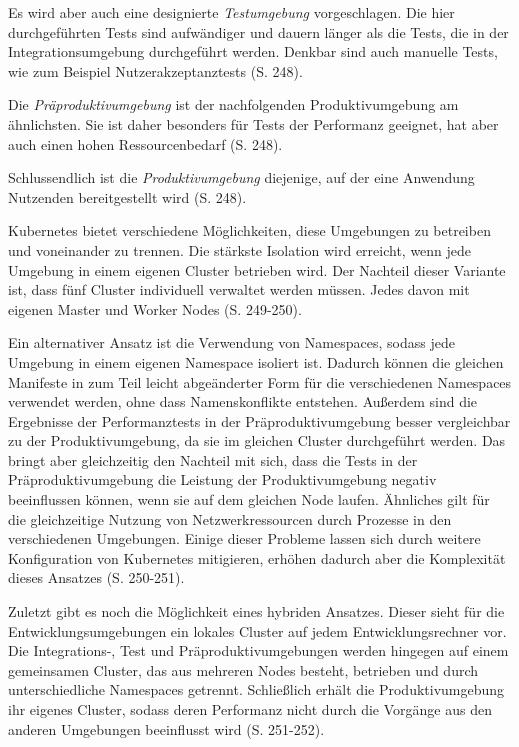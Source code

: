 \documentclass[11pt,a4paper]{article}
\begin{document}
Es wird aber auch eine designierte \emph{Testumgebung} vorgeschlagen.
Die hier durchgeführten Tests sind aufwändiger und dauern länger als
die Tests, die in der Integrationsumgebung durchgeführt werden.
Denkbar sind auch manuelle Tests, wie zum Beispiel Nutzerakzeptanztests \cite{Schmeling_Dargatz_2022} (S. 248).

Die \emph{Präproduktivumgebung} ist der nachfolgenden Produktivumgebung am ähnlichsten.
Sie ist daher besonders für Tests der Performanz geeignet, hat
aber auch einen hohen Ressourcenbedarf \cite{Schmeling_Dargatz_2022} (S. 248).

Schlussendlich ist die \emph{Produktivumgebung} diejenige, auf der eine Anwendung
Nutzenden bereitgestellt wird \cite{Schmeling_Dargatz_2022} (S. 248).

Kubernetes bietet verschiedene Möglichkeiten, diese Umgebungen zu betreiben und voneinander zu trennen.
Die stärkste Isolation wird erreicht, wenn jede Umgebung in einem eigenen Cluster betrieben wird.
Der Nachteil dieser Variante ist, dass fünf Cluster individuell verwaltet werden müssen.
Jedes davon mit eigenen Master und Worker Nodes \cite{Schmeling_Dargatz_2022} (S. 249-250).

Ein alternativer Ansatz ist die Verwendung von Namespaces, sodass jede Umgebung in einem eigenen
Namespace isoliert ist.
Dadurch können die gleichen Manifeste in zum Teil leicht abgeänderter Form für die verschiedenen
Namespaces verwendet werden, ohne dass Namenskonflikte entstehen. Außerdem sind die Ergebnisse
der Performanztests in der Präproduktivumgebung besser vergleichbar zu der Produktivumgebung,
da sie im gleichen Cluster durchgeführt werden.
Das bringt aber gleichzeitig den Nachteil mit sich, dass die Tests in der Präproduktivumgebung
die Leistung der Produktivumgebung negativ beeinflussen können, wenn sie auf dem gleichen Node laufen.
Ähnliches gilt für die gleichzeitige Nutzung von Netzwerkressourcen durch Prozesse in den
verschiedenen Umgebungen. Einige dieser Probleme lassen sich durch weitere Konfiguration
von Kubernetes mitigieren, erhöhen dadurch aber die Komplexität dieses Ansatzes \cite{Schmeling_Dargatz_2022} (S. 250-251).

Zuletzt gibt es noch die Möglichkeit eines hybriden Ansatzes.
Dieser sieht für die Entwicklungsumgebungen ein lokales Cluster auf jedem Entwicklungsrechner vor.
Die Integrations-, Test und Präproduktivumgebungen werden hingegen auf einem gemeinsamen Cluster,
das aus mehreren Nodes besteht, betrieben und durch unterschiedliche Namespaces getrennt.
Schließlich erhält die Produktivumgebung ihr eigenes Cluster, sodass deren Performanz
nicht durch die Vorgänge aus den anderen Umgebungen beeinflusst wird \cite{Schmeling_Dargatz_2022} (S. 251-252).
\end{document}
